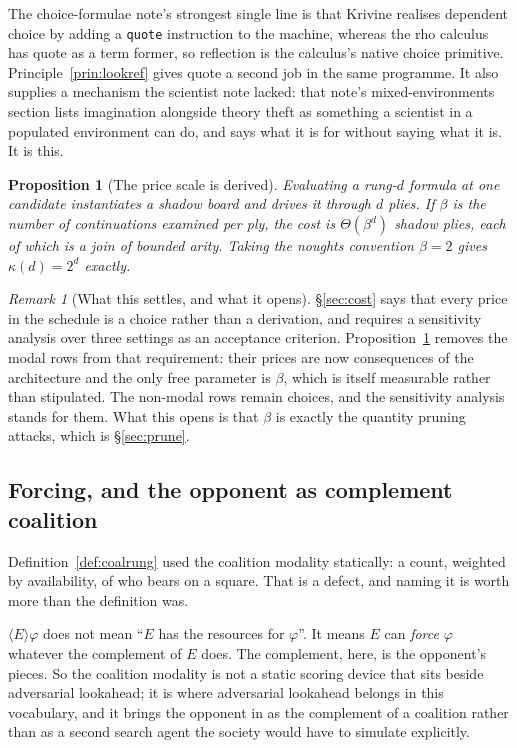 \documentclass[11pt,a4paper]{article}
\theoremstyle{plain}
\newtheorem{proposition}[theorem]{Proposition}
\theoremstyle{definition}
\theoremstyle{remark}
\newtheorem{remark}[theorem]{Remark}
\begin{document}
The choice-formulae note's strongest single line is that Krivine realises
dependent choice by adding a \texttt{quote} instruction to the machine, whereas
the rho calculus has quote as a term former, so reflection is the calculus's
native choice primitive. Principle~\ref{prin:lookref} gives quote a second job
in the same programme. It also supplies a mechanism the scientist note lacked:
that note's mixed-environments section lists imagination alongside theory theft
as something a scientist in a populated environment can do, and says what it is
for without saying what it is. It is this.

\begin{proposition}[The price scale is derived]
\label{prop:derived}
Evaluating a rung-$d$ formula at one candidate instantiates a shadow board and
drives it through $d$ plies. If $\beta$ is the number of continuations examined
per ply, the cost is $\Theta(\beta^d)$ shadow plies, each of which is a join of
bounded arity. Taking the noughts convention $\beta = 2$ gives
$\kappa(d) = 2^d$ exactly.
\end{proposition}

\begin{remark}[What this settles, and what it opens]
\label{rem:derivedopen}
\S\ref{sec:cost} says that every price in the schedule is a choice rather than a
derivation, and requires a sensitivity analysis over three settings as an
acceptance criterion. Proposition~\ref{prop:derived} removes the modal rows from
that requirement: their prices are now consequences of the architecture and the
only free parameter is $\beta$, which is itself measurable rather than
stipulated. The non-modal rows remain choices, and the sensitivity analysis
stands for them. What this opens is that $\beta$ is exactly the quantity
pruning attacks, which is \S\ref{sec:prune}.
\end{remark}

\subsection{Forcing, and the opponent as complement coalition}
\label{sec:forcing}

Definition~\ref{def:coalrung} used the coalition modality statically: a count,
weighted by availability, of who bears on a square. That is a defect, and naming
it is worth more than the definition was.

$\langle E \rangle\varphi$ does not mean ``$E$ has the resources for
$\varphi$''. It means $E$ can \emph{force} $\varphi$ whatever the complement of
$E$ does. The complement, here, is the opponent's pieces. So the coalition
modality is not a static scoring device that sits beside adversarial lookahead;
it is where adversarial lookahead belongs in this vocabulary, and it brings the
opponent in as the complement of a coalition rather than as a second search
agent the society would have to simulate explicitly.
\end{document}
